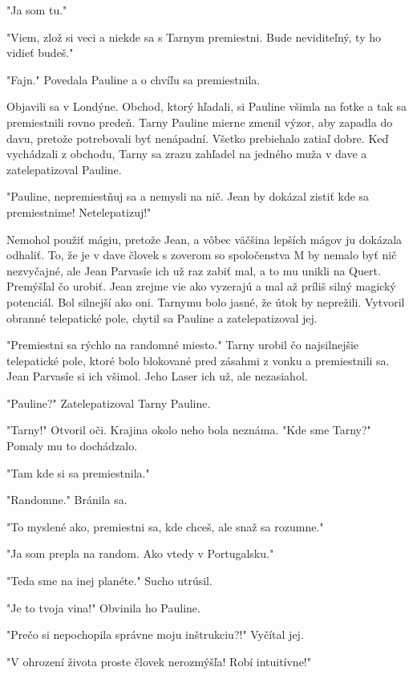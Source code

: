 \documentclass{book}
\begin{document}
"$ $Ja som tu."$ $ 

"$ $Viem, zlož si veci a niekde sa s Tarnym premiestni. Bude neviditeľný, ty ho vidieť budeš."$ $ 

"$ $Fajn."$ $  Povedala Pauline a o chvíľu sa premiestnila.

Objavili sa v Londýne. Obchod, ktorý hľadali, si Pauline všimla na fotke a tak sa premiestnili rovno predeň. Tarny Pauline mierne zmenil výzor, aby zapadla do davu, pretože potrebovali byť nenápadní. Všetko prebiehalo zatiaľ dobre. Keď vychádzali z obchodu, Tarny sa zrazu zahľadel na jedného muža v dave a zatelepatizoval Pauline.

"$ $Pauline, nepremiestňuj sa a nemysli na nič. Jean by dokázal zistiť kde sa premiestnime! Netelepatizuj!"$ $ 

Nemohol použiť mágiu, pretože Jean, a vôbec väčšina lepších mágov ju dokázala odhaliť. To, že je v dave človek s zoverom so spoločenstva M by nemalo byť nič nezvyčajné, ale Jean Parvasîe ich už raz zabiť mal, a to mu unikli na Quert. Premýšľal čo urobiť. Jean zrejme vie ako vyzerajú a mal až príliš silný magický potenciál. Bol silnejší ako oni. Tarnymu bolo jasné, že útok by neprežili. Vytvoril obranné telepatické pole, chytil sa Pauline a zatelepatizoval jej.

"$ $Premiestni sa rýchlo na randomné miesto."$ $  Tarny urobil čo najsilnejšie telepatické pole, ktoré bolo blokované pred zásahmi z vonku a premiestnili sa. Jean Parvasîe si ich všimol. Jeho Laser ich už, ale nezasiahol.

"$ $Pauline?"$ $  Zatelepatizoval Tarny Pauline.

"$ $Tarny!"$ $  Otvoril oči. Krajina okolo neho bola neznáma. "$ $Kde sme Tarny?"$ $  Pomaly mu to dochádzalo.

"$ $Tam kde si sa premiestnila."$ $ 

"$ $Randomne."$ $  Bránila sa.

"$ $To myslené ako, premiestni sa, kde chceš, ale snaž sa rozumne."$ $ 

"$ $Ja som prepla na random. Ako vtedy v Portugalsku."$ $ 

"$ $Teda sme na inej planéte."$ $  Sucho utrúsil.

"$ $Je to tvoja vina!"$ $  Obvinila ho Pauline.

"$ $Prečo si nepochopila správne moju inštrukciu?!"$ $  Vyčítal jej.

"$ $V ohrození života proste človek nerozmýšľa! Robí intuitívne!"$ $ 
\end{document}

